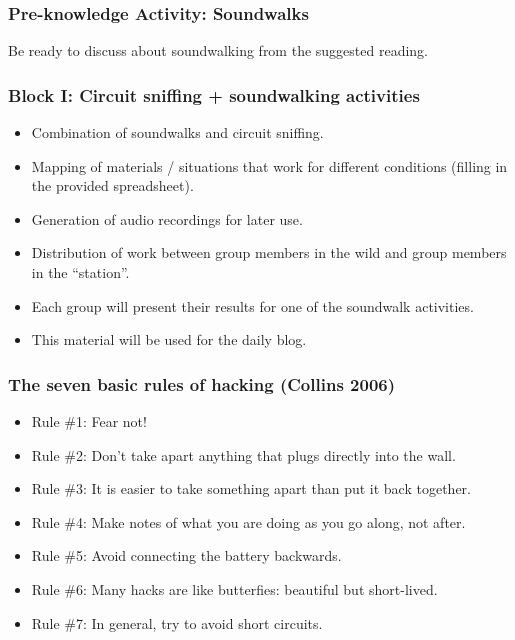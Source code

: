 \documentclass[screen, aspectratio=43]{beamer}
\begin{document}
%
\begin{frame}
  \frametitle{Pre-knowledge Activity: Soundwalks}
  Be ready to discuss about soundwalking from the suggested reading.
\end{frame}
%
\begin{frame}
  \frametitle{Block I: Circuit sniffing + soundwalking activities}
        \begin{itemize}
	\item Combination of soundwalks and circuit sniffing.
	\item Mapping of materials / situations that work for different conditions (filling in the provided spreadsheet).
	\item Generation of audio recordings for later use.
	\item Distribution of work between group members in the wild and group members in the ``station''. 
	\item Each group will present their results for one of the soundwalk activities.
	\item This material will be used for the daily blog.
    \end{itemize} 
\end{frame}
%
\begin{frame}
  \frametitle{The seven basic rules of hacking (Collins 2006)}
        \begin{itemize}
	\item Rule \#1: Fear not!
	\item Rule \#2: Don't take apart anything that plugs directly into the wall.
	\item Rule \#3: It is easier to take something apart than put it back together.
	\item Rule \#4: Make notes of what you are doing as you go along, not after.
	\item Rule \#5: Avoid connecting the battery backwards.
	\item Rule \#6: Many hacks are like butterfies: beautiful but short-lived.
	\item Rule \#7: In general, try to avoid short circuits.
    \end{itemize} 
\end{frame}
%
\end{document}
